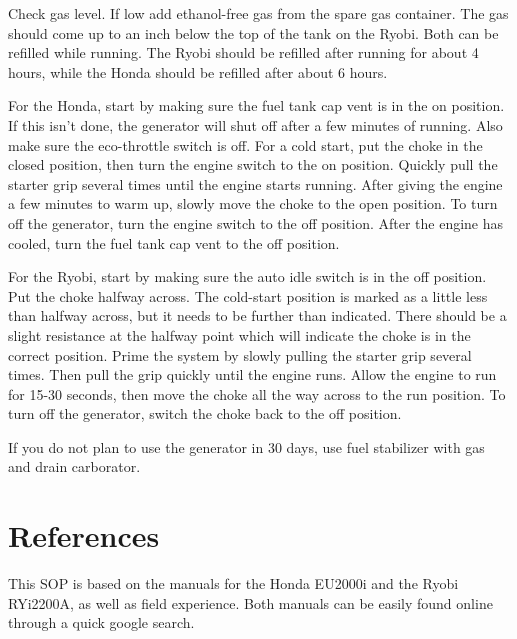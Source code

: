 \documentclass[12pt]{../SOP3_beta}
\begin{document}
\NP Check gas level. If low add ethanol-free gas from the spare gas container. The gas should come up to an inch below the top of the tank on the Ryobi. Both can be refilled while running. The Ryobi should be refilled after running for about 4 hours, while the Honda should be refilled after about 6 hours. 

\NP For the Honda, start by making sure the fuel tank cap vent is in the on position. If this isn't done, the generator will shut off after a few minutes of running. Also make sure the eco-throttle switch is off. For a cold start, put the choke in the closed position, then turn the engine switch to the on position. 
  Quickly pull the starter grip several times until the engine starts running. After giving the engine a few minutes to warm up, slowly move the choke to the open position.
  To turn off the generator, turn the engine switch to the off position. After the engine has cooled, turn the fuel tank cap vent to the off position. 

\NP For the Ryobi, start by making sure the auto idle switch is in the off position. Put the choke halfway across. The cold-start position is marked as a little less than halfway across, but it needs to be further than indicated. There should be a slight resistance at the halfway point which will indicate the choke is in the correct position.
  Prime the system by slowly pulling the starter grip several times. Then pull the grip quickly until the engine runs. Allow the engine to run for 15-30 seconds, then move the choke all the way across to the run position.
  To turn off the generator, switch the choke back to the off position.

\NP If you do not plan to use the generator in 30 days, use fuel stabilizer with gas and drain carborator. 

\section{References}

\NP This SOP is based on the manuals for the Honda EU2000i and the Ryobi RYi2200A, as well as field experience. Both manuals can be easily found online through a quick google search.  
\end{document}
